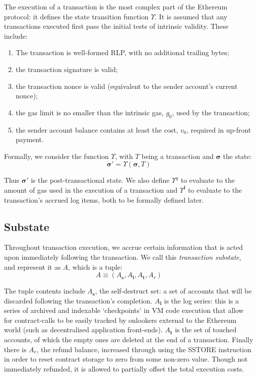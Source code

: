 \documentclass[9pt,oneside]{amsart}
\begin{document}
\begin{multicols}{2}
The execution of a transaction is the most complex part of the Ethereum protocol: it defines the state transition function $\Upsilon$. It is assumed that any transactions executed first pass the initial tests of intrinsic validity. These include:

\begin{enumerate}
\item The transaction is well-formed RLP, with no additional trailing bytes;
\item the transaction signature is valid;
\item the transaction nonce is valid (equivalent to the sender account's current nonce);
\item the gas limit is no smaller than the intrinsic gas, $g_0$, used by the transaction;
\item the sender account balance contains at least the cost, $v_0$, required in up-front payment.
\end{enumerate}

Formally, we consider the function $\Upsilon$, with $T$ being a transaction and $\boldsymbol{\sigma}$ the state:
\begin{equation}
\boldsymbol{\sigma}' = \Upsilon(\boldsymbol{\sigma}, T)
\end{equation}

Thus $\boldsymbol{\sigma}'$ is the post-transactional state. We also define $\Upsilon^g$ to evaluate to the amount of gas used in the execution of a transaction and $\Upsilon^\mathbf{l}$ to evaluate to the transaction's accrued log items, both to be formally defined later.

\subsection{Substate}
Throughout transaction execution, we accrue certain information that is acted upon immediately following the transaction. We call this \textit{transaction substate}, and represent it as $A$, which is a tuple:
\begin{equation}
A \equiv (A_\mathbf{s}, A_\mathbf{l}, A_\mathbf{t}, A_r)
\end{equation}

The tuple contents include $A_\mathbf{s}$, the self-destruct set: a set of accounts that will be discarded following the transaction's completion. $A_\mathbf{l}$ is the log series: this is a series of archived and indexable `checkpoints' in VM code execution that allow for contract-calls to be easily tracked by onlookers external to the Ethereum world (such as decentralised application front-ends). $A_\mathbf{t}$ is the set of touched accounts, of which the empty ones are deleted at the end of a transaction. Finally there is $A_r$, the refund balance, increased through using the {\small SSTORE} instruction in order to reset contract storage to zero from some non-zero value. Though not immediately refunded, it is allowed to partially offset the total execution costs.


\end{multicols}
\end{document}
